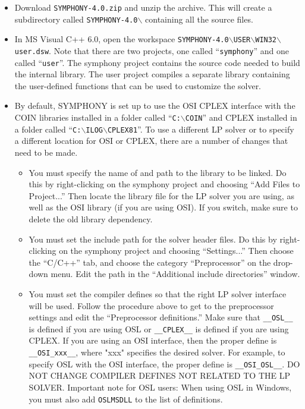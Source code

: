 \begin{itemize}

\item Download {\tt SYMPHONY-4.0.zip} and unzip the archive. This will
create a subdirectory called {\tt SYMPHONY-4.0$\backslash$} containing all 
the source files.

\item In MS Visual C++ 6.0, open the workspace 
{\tt SYMPHONY-4.0$\backslash$USER$\backslash$WIN32$\backslash$user.dsw}.  Note
that there are two projects, one called ``{\tt symphony}'' and one called
``{\tt user}''.  The symphony project contains the source code needed to build
the internal library. The user project compiles a separate library containing
the user-defined functions that can be used to customize the solver.

\item By default, SYMPHONY is set up to use the OSI CPLEX interface with the COIN
libraries installed in a folder called ``\texttt{C:$\backslash$COIN}'' and CPLEX
installed in a folder called
``\texttt{C:$\backslash$ILOG$\backslash$CPLEX81}''. To use a different LP
solver or to specify a different location for OSI or CPLEX, there are a number
of changes that need to be made.

\begin{itemize}

\item You must specify the name of and path to the library to be linked. Do 
this by right-clicking on the symphony project and choosing ``Add Files to
Project...'' Then locate the library file for the LP solver you are using, as
well as the OSI library (if you are using OSI). If you switch, make sure to
delete the old library dependency.

\item You must set the include path for the solver header files. Do this
by right-clicking on the symphony project and choosing ``Settings...'' Then
choose the ``C/C++'' tab, and choose the category ``Preprocessor'' on the
drop-down menu.  Edit the path in the ``Additional include directories'' 
window.

\item You must set the compiler defines so that the right LP solver interface
will be used. Follow the procedure above to get to the preprocessor settings
and edit the ``Preprocessor definitions.'' Make sure that {\tt \_\_OSL\_\_} is
defined if you are using OSL or {\tt \_\_CPLEX\_\_} is defined if you are
using CPLEX. If you are using an OSI interface, then the proper define is
\texttt{\_\_OSI\_xxx\_\_}, where "xxx" specifies the desired solver. For
example, to specify OSL with the OSI interface, the proper define is
\texttt{\_\_OSI\_OSL\_\_}. DO NOT CHANGE COMPILER DEFINES NOT RELATED TO THE LP
SOLVER. Important note for OSL users: When using OSL in Windows, you must also
add \texttt{OSLMSDLL} to the list of definitions.


\end{itemize}
\end{itemize}

